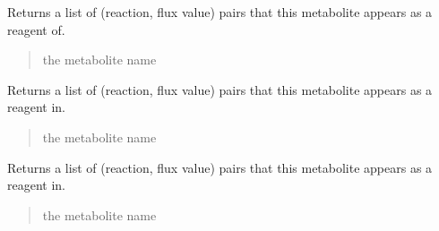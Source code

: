 \documentclass[letterpaper,12pt,english]{sphinxmanual}
\begin{document}
\begin{fulllineitems}

\begin{fulllineitems}
\label{\detokenize{api/core:cbmpy.CBModel.Model.findFluxesForConnectedSpecies}}
\pysigstartsignatures
\pysiglinewithargsret
{}
{}
{}
\pysigstopsignatures
\sphinxAtStartPar
Returns a list of (reaction, flux value) pairs that this metabolite appears as a reagent of.
\begin{quote}\begin{description}
\sphinxAtStartPar
{} \textendash{} the metabolite name

\end{description}\end{quote}

\end{fulllineitems}


\begin{fulllineitems}
\label{\detokenize{api/core:cbmpy.CBModel.Model.getFluxesAssociatedWithSpecies}}
\pysigstartsignatures
\pysiglinewithargsret
{}
{}
{}
\pysigstopsignatures
\sphinxAtStartPar
Returns a list of (reaction, flux value) pairs that this metabolite appears as a reagent in.
\begin{quote}\begin{description}
\sphinxAtStartPar
{} \textendash{} the metabolite name

\end{description}\end{quote}

\end{fulllineitems}


\begin{fulllineitems}
\label{\detokenize{api/core:cbmpy.CBModel.Model.getReactionIdsAssociatedWithSpecies}}
\pysigstartsignatures
\pysiglinewithargsret
{}
{}
{}
\pysigstopsignatures
\sphinxAtStartPar
Returns a list of (reaction, flux value) pairs that this metabolite appears as a reagent in.
\begin{quote}\begin{description}
\sphinxAtStartPar
{} \textendash{} the metabolite name


\end{description}
\end{quote}
\end{fulllineitems}
\end{fulllineitems}
\end{document}
